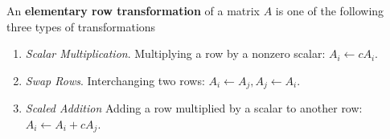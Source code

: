   \begin{definition}
    \label{def:elementary-row-transformation}
    An \textbf{elementary row transformation} of a matrix $A$ is one of the following three types of transformations
    \begin{enumerate}
      \item \textit{Scalar Multiplication}. Multiplying a row by a nonzero scalar: $A_i \gets c A_i$. 
      \item \textit{Swap Rows}. Interchanging two rows: $A_i \gets A_j, A_j \gets A_i$. 
      \item \textit{Scaled Addition} Adding a row multiplied by a scalar to another row: $A_i \gets A_i + c A_j$. 
    \end{enumerate}
  \end{definition} 

